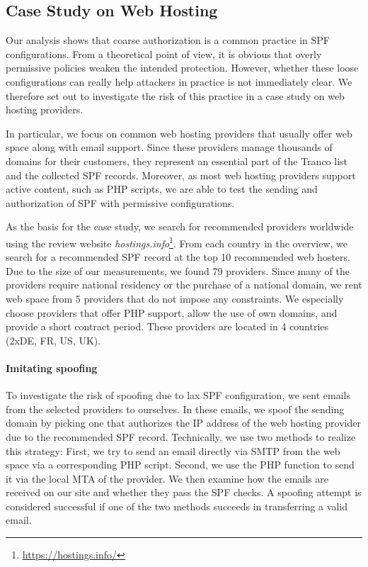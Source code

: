 \subsection{Case Study on Web Hosting}

Our analysis shows that coarse authorization is a common practice in SPF configurations. 
From a theoretical point of view, it is obvious that overly permissive policies weaken the intended protection. 
However, whether these loose configurations can really help attackers in practice is not immediately clear.
We therefore set out to investigate the risk of this practice in a case study on web hosting providers.

In particular, we focus on common web hosting providers that usually offer web space along with email support.
Since these providers manage thousands of domains for their customers, they represent an essential part of the Tranco list and the collected SPF records.
Moreover, as most web hosting providers support active content, such as PHP scripts, we are able to test the sending and authorization of SPF with permissive configurations.

As the basis for the case study, we search for recommended providers worldwide using the review website \emph{hostings.info}\footnote{\url{https://hostings.info/}}.
From each country in the overview, we search for a recommended SPF record at the top 10 recommended web hosters.
Due to the size of our measurements, we found 79 providers.
Since many of the providers require national residency or the purchase of a national domain, we rent web space from 5 providers that do not impose any constraints.
We especially choose providers that offer PHP support, allow the use of own domains, and provide a short contract period.
These providers are located in 4 countries (2xDE, FR, US, UK).


\paragraph{Imitating spoofing}
To investigate the risk of spoofing due to lax SPF configuration, we sent emails from the selected providers to ourselves.
In these emails, we spoof the sending domain by picking one that authorizes the IP address of the web hosting provider due to the recommended SPF record.
Technically, we use two methods to realize this strategy: First, we try to send an email directly via SMTP from the web space via a corresponding PHP script.
Second, we use the PHP function  to send it via the local \ac{MTA} of the provider.
We then examine how the emails are received on our site and whether they pass the SPF checks.
A spoofing attempt is considered successful if one of the two methods succeeds in transferring a valid email.

